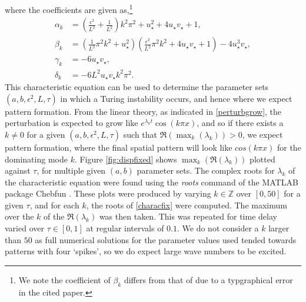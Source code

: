 where the coefficients are given as,\footnote{We note the coefficient of $\beta_k$ differs from that of \cite{yigaffneyli} due to a typgraphical error in the cited paper.}
\begin{equation}\label{fixcoeffs}
    \begin{split}
\alpha_k&=\left(\frac{\epsilon^2}{L^2}+\frac{1}{L^2}\right)k^2\pi^2+u_\star^2+4u_\star v_\star+1,\\
\beta_k&=\left(\frac{1}{L^2}\pi^2k^2+u_\star^2\right)\left(\frac{\epsilon^2}{L^2}\pi^2k^2+4u_\star v_\star+1\right)-4u_\star^3v_\star,\\
\gamma_k&=-6u_\star v_\star,\\
\delta_k&=-{6}{L^2}u_\star v_\star k^2\pi^2.
\end{split}
\end{equation}
This characteristic equation can be used to determine the parameter sets $(a,b,\epsilon^2,L,\tau)$ in which a Turing instability occurs, and hence where we expect pattern formation. From the linear theory, as indicated in \eqref{perturbgrow}, the perturbation is expected to grow like $e^{\lambda_k t}\cos(k\pi x)$, and so if there exists a $k\neq0$ for a given $(a,b,\epsilon^2,L,\tau)$ such that $\Re(\max_k(\lambda_k))>0$, we expect pattern formation, where the final spatial pattern will look like $cos(k\pi x)$ for the dominating mode $k$. Figure \ref{fig:dispfixed} shows $\max_k(\Re(\lambda_k))$ plotted against $\tau$, for multiple given $(a,b)$ parameter sets. The complex roots for $\lambda_k$ of the characteristic equation were found using the \emph{roots} command of the MATLAB package Chebfun \cite{chebfun}. These plots were produced by varying $k\in\mathbb{Z}$ over $[0,50]$ for a given $\tau$, and for each $k$, the roots of \eqref{characfix} were computed. The maximum over the $k$ of the $\Re(\lambda_k)$ was then taken. This was repeated for time delay varied over $\tau\in[0,1]$ at regular intervals of $0.1$. We do not consider a $k$ larger than $50$ as full numerical solutions for the parameter values used tended towards patterns with four `spikes', so we do expect large wave numbers to be excited.


